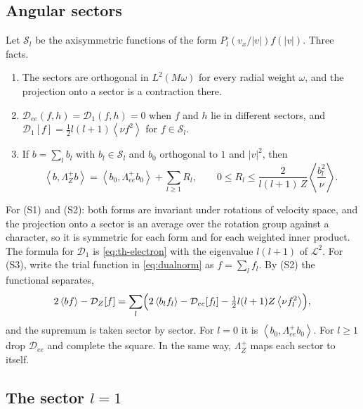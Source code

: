 \documentclass[11pt]{article}
\newcommand{\av}[1]{\left\langle #1\right\rangle}
\newcommand{\D}{\mathcal D}
\newtheorem{lemma}[theorem]{Lemma}
\theoremstyle{definition}
\theoremstyle{remark}
\numberwithin{equation}{section}
\begin{document}
\subsection{Angular sectors}

Let $\mathcal S_l$ be the axisymmetric functions of the form
$P_l(v_x/|v|)f(|v|)$. Three facts.
\begin{enumerate}[label=(S\arabic*)]
\item The sectors are orthogonal in $L^2(M\omega)$ for every radial weight
$\omega$, and the projection onto a sector is a contraction there.
\item $\D_{ee}(f,h)=\D_1(f,h)=0$ when $f$ and $h$ lie in different sectors,
and $\D_1[f]=\tfrac12l(l+1)\av{\nu f^2}$ for $f\in\mathcal S_l$.
\item If $b=\sum_lb_l$ with $b_l\in\mathcal S_l$ and $b_0$ orthogonal to
$1$ and $|v|^2$, then
\begin{equation}
 \av{b,\Lambda_Z^+b}=\av{b_0,\Lambda_{ee}^+b_0}+\sum_{l\geq1}R_l,\qquad
 0\leq R_l\leq\frac{2}{l(l+1)\,Z}\av{\frac{b_l^2}{\nu}} .
 \label{eq:LZ-split}
\end{equation}
\end{enumerate}
For (S1) and (S2): both forms are invariant under rotations of velocity
space, and the projection onto a sector is an average over the rotation
group against a character, so it is symmetric for each form and for each
weighted inner product. The formula for $\D_1$ is \eqref{eq:th-electron}
with the eigenvalue $l(l+1)$ of $\mathcal L^2$. For (S3), write the trial
function in \eqref{eq:dualnorm} as $f=\sum_lf_l$. By (S2) the functional
separates,
\[
 2\av{bf}-\D_Z[f]=\sum_l\Bigl(2\av{b_lf_l}-\D_{ee}[f_l]
    -\tfrac12l(l+1)Z\av{\nu f_l^2}\Bigr),
\]
and the supremum is taken sector by sector. For $l=0$ it is
$\av{b_0,\Lambda_{ee}^+b_0}$. For $l\geq1$ drop $\D_{ee}$ and complete the
square. In the same way, $\Lambda_Z^+$ maps each sector to itself.

\subsection{The sector $l=1$}

\end{document}
